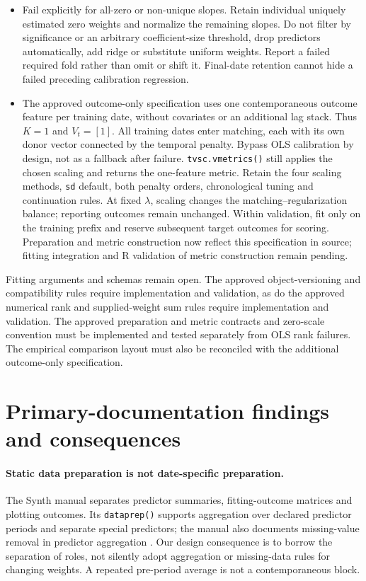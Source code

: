 \documentclass[11pt]{article}
\begin{document}
\begin{itemize}
\item Fail explicitly for all-zero or non-unique slopes. Retain individual
uniquely estimated zero weights and normalize the remaining slopes. Do
not filter by significance or an arbitrary coefficient-size threshold,
drop predictors automatically, add ridge or substitute uniform weights.
Report a failed required fold rather than omit or shift it. Final-date
retention cannot hide a failed preceding calibration regression.
\item The approved outcome-only specification uses one contemporaneous
outcome feature per training date, without covariates or an additional
lag stack. Thus $K=1$ and $V_t=[1]$. All training dates enter matching,
each with its own donor vector connected by the temporal penalty.
Bypass OLS calibration by design, not as a fallback after failure.
\texttt{tvsc.vmetrics()} still applies the chosen scaling and returns
the one-feature metric. Retain the four scaling methods, \texttt{sd}
default, both penalty orders, chronological tuning and continuation rules.
At fixed $\lambda$, scaling changes the matching--regularization balance;
reporting outcomes remain unchanged. Within validation, fit only on the
training prefix and reserve subsequent target outcomes for scoring.
Preparation and metric construction now reflect this specification in
source; fitting integration and R validation of metric construction remain
pending.
\end{itemize}

Fitting arguments and schemas remain open. The approved object-versioning
and compatibility rules require implementation and validation, as do the
approved numerical rank and
supplied-weight sum rules require implementation and validation.
The approved preparation and metric
contracts and zero-scale convention must be
implemented and tested separately from OLS rank failures.
The empirical comparison layout must
also be reconciled with the additional outcome-only specification.

\section{Primary-documentation findings and consequences}
\paragraph{Static data preparation is not date-specific preparation.}
The Synth manual separates predictor summaries, fitting-outcome matrices
and plotting outcomes. Its \texttt{dataprep()} supports aggregation over
declared predictor periods and separate special predictors; the manual
also documents missing-value removal in predictor aggregation
\cite{synth}. Our design consequence is to borrow the separation of
roles, not silently adopt aggregation or missing-data rules for changing
weights. A repeated pre-period average is not a contemporaneous block.
\end{document}
